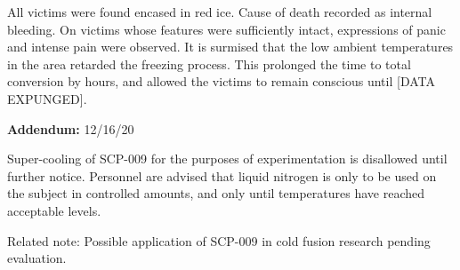 All victims were found encased in red ice. Cause of death recorded as internal bleeding. On victims whose features were sufficiently intact, expressions of panic and intense pain were observed. It is surmised that the low ambient temperatures in the area retarded the freezing process. This prolonged the time to total conversion by  hours, and allowed the victims to remain conscious until [DATA EXPUNGED].

\textbf{Addendum:} 12/16/20

Super-cooling of SCP-009 for the purposes of experimentation is disallowed until further notice. Personnel are advised that liquid nitrogen is only to be used on the subject in controlled amounts, and only until temperatures have reached acceptable levels.

Related note: Possible application of SCP-009 in cold fusion research pending evaluation.